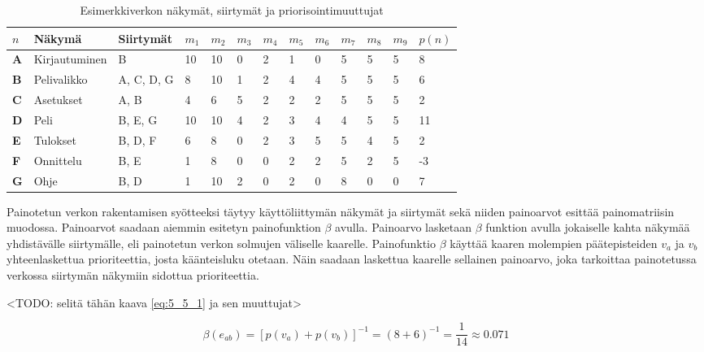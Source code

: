   \begin{table}[H]
    \caption{Esimerkkiverkon näkymät, siirtymät ja priorisointimuuttujat}
    \label{tab:esimerkki_verkon_priorisointi_muuttujat}
    \centering
    \begin{tabular}{l|l|l|l|l|l|l|l|l|l|l|l|l} \hline
    \(n\) & \textbf{Näkymä} & \textbf{Siirtymät} & \(m_1\) & \(m_2\) & \(m_3\) & \(m_4\) & \(m_5\) & \(m_6\) & \(m_7\) & \(m_8\) & \(m_9\) & \(p(n)\) \\ \hline
    \textbf{A} & Kirjautuminen & B & 10 & 10 & 0 & 2 & 1 & 0 & 5 & 5 & 5 & 8 \\
    \textbf{B} & Pelivalikko & A, C, D, G & 8 & 10 & 1 & 2 & 4 & 4 & 5 & 5 & 5 & 6 \\
    \textbf{C} & Asetukset & A, B & 4 & 6 & 5 & 2 & 2 & 2 & 5 & 5 & 5 & 2 \\
    \textbf{D} & Peli & B, E, G & 10 & 10 & 4 & 2 & 3 & 4 & 4 & 5 & 5 & 11 \\
    \textbf{E} & Tulokset & B, D, F & 6 & 8 & 0 & 2 & 3 & 5 & 5 & 4 & 5 & 2 \\
    \textbf{F} & Onnittelu & B, E & 1 & 8 & 0 & 0 & 2 & 2 & 5 & 2 & 5 & -3 \\
    \textbf{G} & Ohje & B, D & 1 & 10 & 2 & 0 & 2 & 0 & 8 & 0 & 0 & 7 \\ \hline
    \end{tabular}
  \end{table}

  Painotetun verkon rakentamisen syötteeksi täytyy käyttöliittymän näkymät ja siirtymät sekä niiden painoarvot esittää painomatriisin muodossa.
  Painoarvot saadaan aiemmin esitetyn painofunktion \(\beta\) avulla.
  Painoarvo lasketaan \(\beta\) funktion avulla jokaiselle kahta näkymää yhdistävälle siirtymälle, eli painotetun verkon solmujen väliselle kaarelle.
  Painofunktio \(\beta\) käyttää kaaren molempien päätepisteiden \(v_a\) ja \(v_b\) yhteenlaskettua prioriteettia, josta käänteisluku otetaan.
  Näin saadaan laskettua kaarelle sellainen painoarvo, joka tarkoittaa painotetussa verkossa siirtymän näkymiin sidottua prioriteettia.

  <TODO: selitä tähän kaava \ref{eq:5_5_1} ja sen muuttujat>

  \begin{equation} \label{eq:5_5_1}
    \beta(e_{ab}) = [p(v_a) + p(v_b)]^{-1} = (8 + 6)^{-1} = \frac{1}{14} \approx 0.071
  \end{equation}

